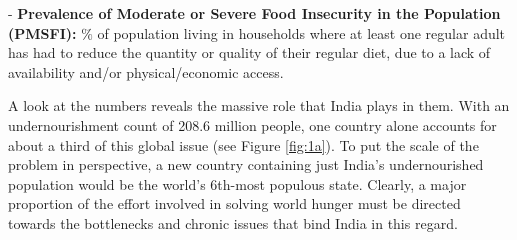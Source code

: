 \documentclass{article}
\begin{document}
- \textbf{Prevalence of Moderate or Severe Food Insecurity in the Population (PMSFI):} $\%$ of population living in households where at least one regular adult has had to reduce the quantity or quality of their regular diet, due to a lack of availability and/or physical/economic access.

A look at the numbers reveals the massive role that India plays in them. With an undernourishment count of 208.6 million people, one country alone accounts for about a third of this global issue (see Figure \ref{fig:1a}). To put the scale of the problem in perspective, a new country containing just India's undernourished population would be the world's 6th-most populous state. Clearly, a major proportion of the effort involved in solving world hunger must be directed towards the bottlenecks and chronic issues that bind India in this regard.
\end{document}
